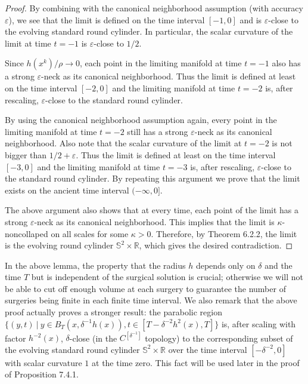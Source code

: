\begin{proof}
By combining with the canonical neighborhood assumption (with
accuracy $\varepsilon$), we see that the limit is defined on the
time interval $[-1,0]$ and is $\varepsilon$-close to the evolving
standard round cylinder. In particular, the scalar curvature of
the limit at time $t=-1$ is $\varepsilon$-close to $1/2$.

Since $h(x^k)/\rho\rightarrow0$, each point in the limiting
manifold at time $t=-1$ also has a strong $\varepsilon$-neck as
its canonical neighborhood. Thus the limit is defined at least on
the time interval $[-2,0]$ and the limiting manifold at time
$t=-2$ is, after rescaling, $\varepsilon$-close to the standard
round cylinder.

By using the canonical neighborhood assumption again, every point
in the limiting manifold at time $t=-2$ still has a strong
$\varepsilon$-neck as its canonical neighborhood. Also note that
the scalar curvature of the limit at $t=-2$ is not bigger than
$1/2+\varepsilon$. Thus the limit is defined at least on the time
interval $[-3,0]$ and the limiting manifold at time $t=-3$ is,
after rescaling, $\varepsilon$-close to the standard round
cylinder. By repeating this argument we prove that the limit
exists on the ancient time interval $(-\infty, 0]$.

The above argument also shows that at every time, each point of
the limit has a strong $\varepsilon$-neck as its canonical
neighborhood. This implies that the limit is $\kappa$-noncollaped
on all scales for some $\kappa>0$. Therefore, by Theorem 6.2.2,
the limit is the evolving round cylinder
$\mathbb{S}^2\times\mathbb{R}$, which gives the desired
contradiction.
\end{proof}

In the above lemma, the property that the radius $h$ depends only
on $\delta$ and the time $T$ but is independent of the surgical
solution is crucial; otherwise we will not be able to cut off
enough volume at each surgery to guarantee the number of surgeries
being finite in each finite time interval. We also remark that the
above proof actually proves a stronger result: the parabolic
region $\{(y,t)\ |\ y\in
B_T(x,\delta^{-1}h(x)),t\in[T-\delta^{-2}h^2(x),T]\}$ is, after
scaling with factor $h^{-2}(x)$, $\delta$-close (in the
$C^{[\delta^{-1}]}$ topology) to the corresponding subset of the
evolving standard round cylinder $\mathbb{S}^2 \times \mathbb{R}$
over the time interval $[-\delta^{-2},0]$ with scalar curvature
$1$ at the time zero. This fact will be used later in the proof of
Proposition 7.4.1.

